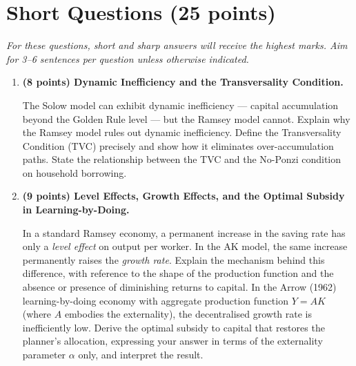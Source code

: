 \documentclass[a4paper,11pt]{article}
\begin{document}
\section{Short Questions \hfill (25 points)}

\noindent\textit{For these questions, short and sharp answers will receive the highest marks.
Aim for 3--6 sentences per question unless otherwise indicated.}

\vspace{8pt}

\begin{enumerate}[label=\textbf{\arabic*.}, leftmargin=*, itemsep=14pt]

    \item \textbf{(8 points) Dynamic Inefficiency and the Transversality Condition.}

    The Solow model can exhibit dynamic inefficiency --- capital accumulation beyond the
    Golden Rule level --- but the Ramsey model cannot.  Explain why the Ramsey model rules
    out dynamic inefficiency.  Define the Transversality Condition (TVC) precisely and show
    how it eliminates over-accumulation paths.  State the relationship between the TVC and
    the No-Ponzi condition on household borrowing.

    \item \textbf{(9 points) Level Effects, Growth Effects, and the Optimal Subsidy in
    Learning-by-Doing.}

    In a standard Ramsey economy, a permanent increase in the saving rate has only a
    \emph{level effect} on output per worker.  In the AK model, the same increase
    permanently raises the \emph{growth rate}.  Explain the mechanism behind this
    difference, with reference to the shape of the production function and the absence or
    presence of diminishing returns to capital.  In the Arrow (1962) learning-by-doing
    economy with aggregate production function $Y = AK$ (where $A$ embodies the
    externality), the decentralised growth rate is inefficiently low.  Derive the optimal
    subsidy to capital that restores the planner's allocation, expressing your answer in
    terms of the externality parameter $\alpha$ only, and interpret the result.


\end{enumerate}
\end{document}
